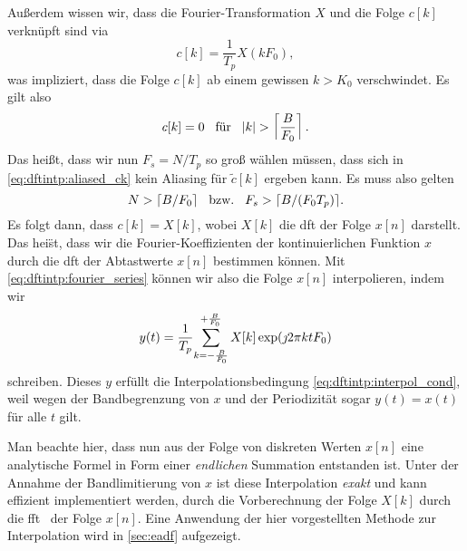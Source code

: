 Au{\ss}erdem wissen wir, dass die Fourier-Transformation $X$ und die Folge $c[k]$ verkn\"upft sind via 
\begin{equation}
    c[k] = \frac{1}{T_p} X(k F_0),
\end{equation}
was impliziert, dass die Folge $c[k]$ ab einem gewissen $k > K_0$ verschwindet.
Es gilt also
\begin{equation}
    c[k] = 0 {\hspace{3mm} \text{f\"ur} \hspace{3mm}} {\left| k \right|} > \left\lceil \frac{B}{F_0} \right\rceil.
\end{equation}
Das hei{\ss}t, dass wir nun $F_s = N/T_p$ so gro{\ss} w\"ahlen m\"ussen, dass sich in \eqref{eq:dftintp:aliased_ck} kein Aliasing f\"ur $\tilde{c}[k]$ ergeben kann.
Es muss also gelten
\begin{equation}
    N > \lceil B/F_0 \rceil {\hspace{3mm} \text{bzw.} \hspace{3mm}} F_s > \lceil B/(F_0 T_p) \rceil.
\end{equation}
Es folgt dann, dass $c[k] = X[k]$, wobei $X[k]$ die \gls{dft} der Folge $x[n]$ darstellt. 
Das hei\"st, dass wir die Fourier-Koeffizienten der kontinuierlichen Funktion $x$ durch die \gls{dft} der Abtastwerte $x[n]$ bestimmen k\"onnen. 
Mit \eqref{eq:dftintp:fourier_series} k\"onnen wir also die Folge $x[n]$ interpolieren, indem wir
\begin{equation}\label{eq:dftintp:dft_interpolation}
    y(t) = \frac{1}{T_p}{\sum\limits_{k=-\frac{B}{F_0}}^{+\frac{B}{F_0}}{
        X[k] \exp(\jmath 2 \pi k t F_0) 
    }}
\end{equation}
schreiben. 
Dieses $y$ erf\"ullt die Interpolationsbedingung \eqref{eq:dftintp:interpol_cond}, weil wegen der Bandbegrenzung von $x$ und der Periodizit\"at sogar $y(t) = x(t)$ f\"ur alle $t$ gilt.

Man beachte hier, dass nun aus der Folge von diskreten Werten $x[n]$ eine analytische Formel in Form einer \emph{endlichen} Summation entstanden ist. 
Unter der Annahme der Bandlimitierung von $x$ ist diese Interpolation \emph{exakt} und kann effizient implementiert werden, durch die Vorberechnung der Folge $X[k]$ durch die \gls{fft}~\cite{FFTW05} der Folge $x[n]$. 
Eine Anwendung der hier vorgestellten Methode zur Interpolation wird in \cref{sec:eadf} aufgezeigt.